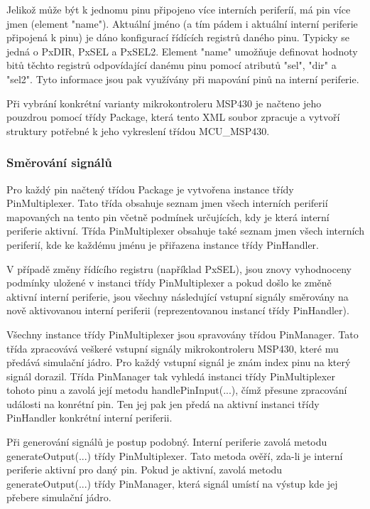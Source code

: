 Jelikož může být k jednomu pinu připojeno více interních periferíí, má pin více jmen (element "name"). Aktuální jméno (a tím pádem i aktuální interní periferie připojená k pinu) je dáno konfigurací řídících registrů daného pinu. Typicky se jedná o PxDIR, PxSEL a PxSEL2. Element "name" umožňuje definovat hodnoty bitů těchto registrů odpovídající danému pinu pomocí atributů "sel", "dir" a "sel2". Tyto informace jsou pak využívány při mapování pinů na interní periferie.

Při vybrání konkrétní varianty mikrokontroleru MSP430 je načteno jeho pouzdrou pomocí třídy Package, která tento XML soubor zpracuje a vytvoří struktury potřebné k jeho vykreslení třídou MCU\_MSP430.

\subsubsection{Směrování signálů}

Pro každý pin načtený třídou Package je vytvořena instance třídy PinMultiplexer. Tato třída obsahuje seznam jmen všech interních periferií mapovaných na tento pin včetně podmínek určujících, kdy je která interní periferie aktivní. Třída PinMultiplexer obsahuje také seznam jmen všech interních periferií, kde ke každému jménu je přiřazena instance třídy PinHandler.

V případě změny řídícího registru (například PxSEL), jsou znovy vyhodnoceny podmínky uložené v instanci třídy PinMultiplexer a pokud došlo ke změně aktivní interní periferie, jsou všechny následující vstupní signály směrovány na nově aktivovanou interní periferii (reprezentovanou instancí třídy PinHandler).

Všechny instance třídy PinMultiplexer jsou spravovány třídou PinManager. Tato třída zpracovává veškeré vstupní signály mikrokontroleru MSP430, které mu předává simulační jádro. Pro každý vstupní signál je znám index pinu na který signál dorazil. Třída PinManager tak vyhledá instanci třídy PinMultiplexer tohoto pinu a zavolá její metodu handlePinInput(...), čímž přesune zpracování události na konrétní pin. Ten jej pak jen předá na aktivní instanci třídy PinHandler konkrétní interní periferii.

Při generování signálů je postup podobný. Interní periferie zavolá metodu generateOutput(...) třídy PinMultiplexer. Tato metoda ověří, zda-li je interní periferie aktivní pro daný pin. Pokud je aktivní, zavolá metodu generateOutput(...) třídy PinManager, která signál umístí na výstup kde jej přebere simulační jádro.


